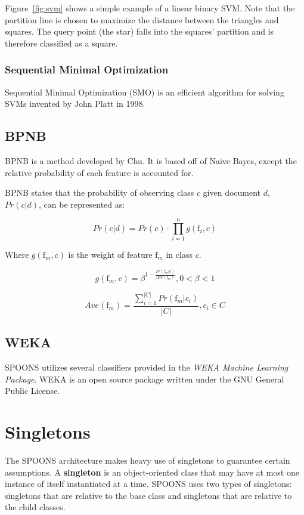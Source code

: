 \documentclass[12pt]{ucthesis}
\begin{document}
Figure~\ref{fig:svm} shows a simple example of a linear binary SVM.
Note that the partition line is chosen to maximize the distance between the triangles and squares.
The query point (the star) falls into the squares' partition and is therefore classified as a square.

\subsubsection{Sequential Minimal Optimization}
\label{background-classifiers-svm-smo}
Sequential Minimal Optimization (SMO) is an efficient algorithm for solving SVMs invented by John Platt in 1998\cite{Platt}.

\subsection{BPNB}
\label{background-classifiers-bpnb}
BPNB is a method developed by Chu\cite{bpnb}.
It is based off of Naive Bayes, except the relative probability of each feature is accounted for.

BPNB states that the probability of observing class $c$ given document $d$, $Pr(c|d)$, can be represented as:

\begin{equation}
   Pr(c|d) = Pr(c) \cdot \prod_{i = 1}^{n}g(\textrm{f}_{i},c)
\end{equation}

Where $g(\textrm{f}_{m}, c)$ is the weight of feature $\textrm{f}_m$ in class $c$.

\begin{equation}
   g(\textrm{f}_m, c) = \beta^{1 - \frac{Pr(\textrm{f}_m|c)}{Ave(\textrm{f}_m)}}, 0 < \beta < 1
\end{equation}

\begin{equation}
   Ave(\textrm{f}_m) = \frac{\sum_{i=1}^{|C|} Pr(\textrm{f}_m|c_{i})}{|C|}, c_i \in C
\end{equation}

\subsection{WEKA}
\label{background-weka}
SPOONS utilizes several classifiers provided in the \textit{WEKA Machine Learning Package}.
WEKA is an open source package written under the GNU General Public License\cite{weka}.

\section{Singletons}
\label{background-singletons}
The SPOONS architecture makes heavy use of singletons to guarantee certain assumptions.
A \textbf{singleton} is an object-oriented class that may have at most one instance of itself instantiated at a time.
SPOONS uses two types of singletons: singletons that are relative to the base class and singletons that are relative to the
child classes.
\end{document}

